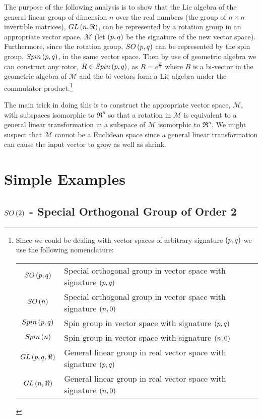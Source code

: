 The purpose of the following analysis is to show that the Lie algebra of the general linear group of dimension $n$
over the real numbers (the group of $n\times n$ invertible matrices), $GL\left ( {n,\Re} \right )$, can be represented by a rotation
group in an appropriate vector space, $\mathcal{M}$ (let $\left ( {p,q} \right )$ be the signature of the new vector space). Furthermore, 
since the rotation group, $SO\left ( {p,q} \right )$ can be represented by the spin group, $Spin\left ( {p,q} \right )$, in the same vector space. Then by use of
geometric algebra we can construct any rotor, $R\in Spin\left ( {p,q} \right )$, as $R = e^{\frac{B}{2}}$ where $B$ is a bi-vector in the geometric 
algebra of $\mathcal{M}$ and the bi-vectors form a Lie algebra under the commutator product.\footnote{Since we could be dealing with
vector spaces of arbitrary signature $\left ( {p,q} \right )$ we use the following nomenclature:
\begin{center}\begin{tabular}{cl}
	${SO}\left ( {p,q} \right )$  & Special orthogonal group in vector space with signature $\left ( {p,q} \right )$ \\
	${SO}\left ( {n} \right )$  & Special orthogonal group in vector space with signature $\left ( {n,0} \right )$ \\
	${Spin}\left ( {p,q} \right )$  & Spin group in vector space with signature $\left ( {p,q} \right )$ \\
	${Spin}\left ( {n} \right )$  & Spin group in vector space with signature $\left ( {n,0} \right )$ \\
	${GL}\left ( {p,q,\Re} \right )$  & General linear group in real vector space with signature $\left ( {p,q} \right )$ \\
	${GL}\left ( {n,\Re} \right )$  & General linear group in real vector space with signature $\left ( {n,0} \right )$
\end{tabular}\end{center}}

The main trick in doing this is to construct the appropriate vector space, $\mathcal{M}$, with subspaces isomorphic to $\Re^{n}$
so that a rotation in $\mathcal{M}$ is equivalent to a general linear transformation in a subspace of $\mathcal{M}$ isomorphic 
to $\Re^{n}$.  We might suspect that $\mathcal{M}$ cannot be a Euclidean space since a general linear transformation can cause
the input vector to grow as well as shrink.

\section{Simple Examples}

\subsection{${SO}\left ( {2} \right )$ - Special Orthogonal Group of Order 2}

